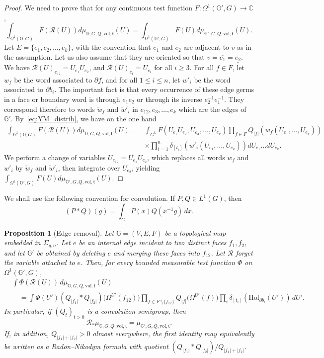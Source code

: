 \documentclass[11pt,a4paper,reqno]{article}
\newtheorem{proposition}[theorem]{Proposition}
\theoremstyle{definition}
\theoremstyle{remark}
\newcommand\C{\mathbb{C}}
\newcommand\vol{\mathrm{vol}}
\newcommand\Gbb{{\mathbb{G}}}
\newcommand\Hol{{\mathrm{Hol}}}
\begin{document}
\begin{proof}
We need to prove that for any continuous test function $F:\Omega^1(\Gbb',G)\to\C$,
\[
\int_{\Omega^1(\Gbb,G)}F(\mathcal{R}(U))d\mu_{\Gbb,G,Q,\vol,\mathfrak{t}}(U)=\int_{\Omega^1(\Gbb',G)}F(U)d\mu_{\Gbb',G,Q,\vol,\mathfrak{t}}(U).
\]
Let $E=\{e_1,e_2,\ldots,e_k\}$, with the convention that $e_1$ and $e_2$ are adjacent to $v$ as in the assumption. Let us also assume that they are oriented so that $v=\overline{e_1}=\underline{e_2}$. We have $\mathcal{R}(U)_{e_{12}}=U_{e_1}U_{e_2}$, and $\mathcal{R}(U)_{e_i}=U_{e_i}$ for all $i\geq 3$. For all $f\in F$, let $w_f$ be the word associated to $\partial f$, and for all $1\leq i\leq n$, let $w'_i$ be the word associated to $\partial b_i$. The important fact is that every occurrence of these edge germs in a face or boundary word is through $e_1e_2$ or through its inverse $e_2^{-1}e_1^{-1}$. They correspond therefore to words $\tilde{w}_f$ and $\tilde{w}'_i$ in $e_{12},e_3,\ldots,e_k$ which are the edges of $\Gbb'$. By~\eqref{eq:YM_distrib}, we have on the one hand
\begin{align*}
\int_{\Omega^1(\Gbb,G)}F(\mathcal{R}(U))d\mu_{\Gbb,G,Q,\vol,\mathfrak{t}}(U)= & \int_{G^k}F(U_{e_1}U_{e_2},U_{e_3},\ldots,U_{e_k})\prod_{f\in F}Q_{\vert f\vert}(w_f(U_{e_1},\ldots,U_{e_k}))\\
&\times\prod_{i=1}^n\delta_{[t_i]}(w'_i(U_{e_1},\ldots,U_{e_k}))dU_{e_1}\ldots dU_{e_k}.
\end{align*}
We perform a change of variables $U_{e_{12}}=U_{e_1}U_{e_2}$, which replaces all words $w_f$ and $w'_i$ by $\tilde{w}_f$ and $\tilde{w}'_i$, then integrate over $U_{e_2}$, yielding $\int_{\Omega^1(\Gbb',G)}F(U)d\mu_{\Gbb',G,Q,\vol,\mathfrak{t}}(U)$.
\end{proof}



We shall use the following convention for convolution. If $P,Q\in L^1(G)$, then
\[
 (P*Q)(g)=\int_G P(x)Q(x^{-1}g)\,dx .
\]

\begin{proposition}[Edge removal]\label{prop:edge_removal}
Let $\mathbb G=(V,E,F)$ be a topological map embedded in $\Sigma_{g,n}$.
Let $e$ be an internal edge incident to two distinct faces $f_1,f_2$, and
let $\mathbb G'$ be obtained by deleting $e$ and merging these faces into
$f_{12}$. Let $\mathcal R$ forget the variable attached to $e$. Then, for
every bounded measurable test function $\Phi$ on
$\Omega^1(\mathbb G',G)$,
\begin{align*}
 &\int \Phi(\mathcal R(U))\,
 d\mu_{\mathbb G,G,Q,\vol,\mathfrak t}(U)\\
 &\quad=
 \int \Phi(U')
 (Q_{|f_1|}*Q_{|f_2|})
 \bigl(\Omega^{U'}(f_{12})\bigr)
 \prod_{f\in F'\setminus\{f_{12}\}}
 Q_{|f|}\bigl(\Omega^{U'}(f)\bigr)
 \prod_i\delta_{[t_i]}(\Hol_{\partial b_i}(U'))\,dU'.
\end{align*}
In particular, if $(Q_t)_{t>0}$ is a convolution semigroup, then
\[
 \mathcal R_*\mu_{\mathbb G,G,Q,\vol,\mathfrak t}
 =\mu_{\mathbb G',G,Q,\vol,\mathfrak t}.
\]
If, in addition, $Q_{|f_1|+|f_2|}>0$ almost everywhere, the first identity
may equivalently be written as a Radon--Nikodym formula with quotient
$(Q_{|f_1|}*Q_{|f_2|})/Q_{|f_1|+|f_2|}$.
\end{proposition}
\end{document}
